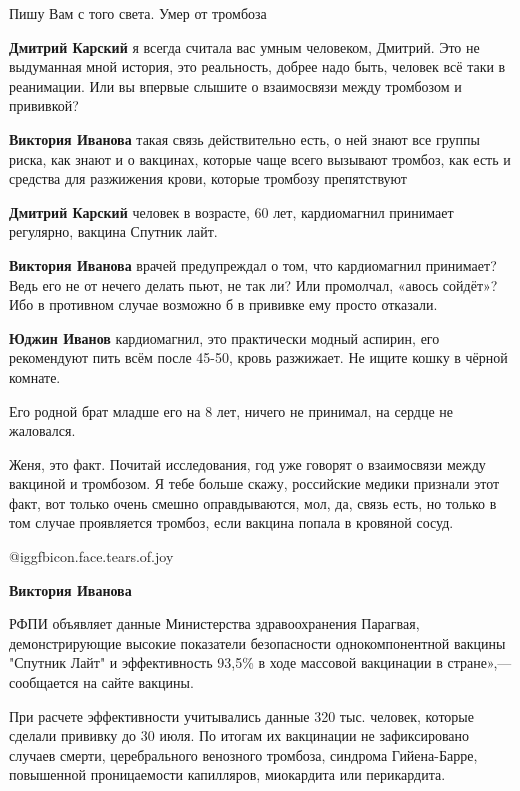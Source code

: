 \begin{itemize}
\begin{itemize}
\end{itemize} %

Пишу Вам с того света. Умер от тромбоза

\begin{itemize} %
\textbf{Дмитрий Карский} я всегда считала вас умным человеком, Дмитрий. Это не выдуманная мной история, это реальность, добрее надо быть, человек всё таки в реанимации. Или вы впервые слышите о взаимосвязи между тромбозом и прививкой?

\textbf{Виктория Иванова} такая связь действительно есть, о ней знают все группы риска, как знают и о вакцинах, которые чаще всего вызывают тромбоз, как есть и средства для разжижения крови, которые тромбозу препятствуют

\textbf{Дмитрий Карский} человек в возрасте, 60 лет, кардиомагнил принимает регулярно, вакцина Спутник лайт.

\textbf{Виктория Иванова} врачей предупреждал о том, что кардиомагнил принимает? Ведь его не от нечего делать пьют, не так ли? Или промолчал, «авось сойдёт»? Ибо в противном случае возможно б в прививке ему просто отказали.

\textbf{Юджин Иванов} кардиомагнил, это практически модный аспирин, его рекомендуют пить всём после 45-50, кровь разжижает. Не ищите кошку в чёрной комнате.

Его родной брат младше его на 8 лет, ничего не принимал, на сердце не жаловался.

Женя, это факт. Почитай исследования, год уже говорят о взаимосвязи между
вакциной и тромбозом. Я тебе больше скажу, российские медики признали этот
факт, вот только очень смешно оправдываются, мол, да, связь есть, но только в
том случае проявляется тромбоз, если вакцина попала в кровяной сосуд.

@igg{fbicon.face.tears.of.joy} 

\textbf{Виктория Иванова} 

РФПИ объявляет данные Министерства здравоохранения Парагвая, демонстрирующие
высокие показатели безопасности однокомпонентной вакцины "Спутник Лайт" и
эффективность 93,5\% в ходе массовой вакцинации в стране»,— сообщается на сайте
вакцины.

При расчете эффективности учитывались данные 320 тыс. человек, которые сделали
прививку до 30 июля. По итогам их вакцинации не зафиксировано случаев смерти,
церебрального венозного тромбоза, синдрома Гийена-Барре, повышенной
проницаемости капилляров, миокардита или перикардита.


\end{itemize}
\end{itemize}
